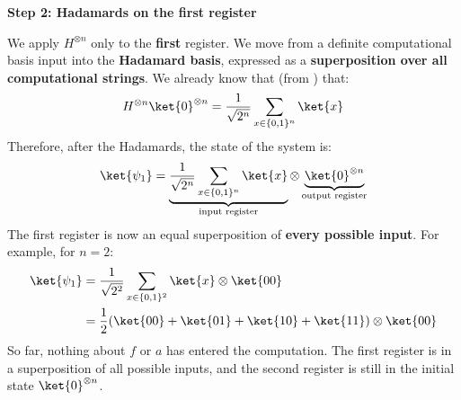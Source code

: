 \highspace
\begin{flushleft}
    \textcolor{Green3}{ \textbf{Step 2: Hadamards on the first register}}
\end{flushleft}
We apply $H^{\otimes n}$ only to the \textbf{first} register.
We move from a definite computational basis input into the \textbf{Hadamard basis}, expressed as a \textbf{superposition over all computational strings}.
We already know that (from ) that:
\begin{equation*}
    H^{\otimes n} \ket{0}^{\otimes n} = \frac{1}{\sqrt{2^n}} \sum_{x \in \{0,1\}^n} \ket{x}
\end{equation*}
Therefore, after the Hadamards, the state of the system is:
\begin{equation*}
    \ket{\psi_1} = \underbrace{\frac{1}{\sqrt{2^n}} \sum_{x \in \{0,1\}^n} \ket{x}}_{\text{input register}} \otimes \underbrace{\ket{0}^{\otimes n}}_{\text{output register}}
\end{equation*}
The first register is now an equal superposition of \textbf{every possible input}. For example, for $n = 2$:
\begin{align*}
    \ket{\psi_1} &= \frac{1}{\sqrt{2^2}} \sum_{x \in \{0,1\}^2} \ket{x} \otimes \ket{00} \\
    &= \frac{1}{2} (\ket{00} + \ket{01} + \ket{10} + \ket{11}) \otimes \ket{00}
\end{align*}
So far, nothing about $f$ or $a$ has entered the computation. The first register is in a superposition of all possible inputs, and the second register is still in the initial state $\ket{0}^{\otimes n}$.

